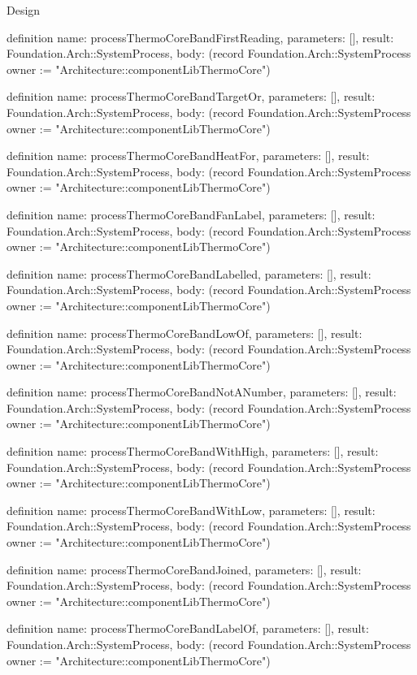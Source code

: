 \begin{lexlean}{Design}
\begin{semanticmodule}
definition{
  name: processThermoCoreBandFirstReading,
  parameters: [],
  result: Foundation.Arch::SystemProcess,
  body: (record Foundation.Arch::SystemProcess {owner := "Architecture::componentLibThermoCore"})
}

definition{
  name: processThermoCoreBandTargetOr,
  parameters: [],
  result: Foundation.Arch::SystemProcess,
  body: (record Foundation.Arch::SystemProcess {owner := "Architecture::componentLibThermoCore"})
}

definition{
  name: processThermoCoreBandHeatFor,
  parameters: [],
  result: Foundation.Arch::SystemProcess,
  body: (record Foundation.Arch::SystemProcess {owner := "Architecture::componentLibThermoCore"})
}

definition{
  name: processThermoCoreBandFanLabel,
  parameters: [],
  result: Foundation.Arch::SystemProcess,
  body: (record Foundation.Arch::SystemProcess {owner := "Architecture::componentLibThermoCore"})
}

definition{
  name: processThermoCoreBandLabelled,
  parameters: [],
  result: Foundation.Arch::SystemProcess,
  body: (record Foundation.Arch::SystemProcess {owner := "Architecture::componentLibThermoCore"})
}

definition{
  name: processThermoCoreBandLowOf,
  parameters: [],
  result: Foundation.Arch::SystemProcess,
  body: (record Foundation.Arch::SystemProcess {owner := "Architecture::componentLibThermoCore"})
}

definition{
  name: processThermoCoreBandNotANumber,
  parameters: [],
  result: Foundation.Arch::SystemProcess,
  body: (record Foundation.Arch::SystemProcess {owner := "Architecture::componentLibThermoCore"})
}

definition{
  name: processThermoCoreBandWithHigh,
  parameters: [],
  result: Foundation.Arch::SystemProcess,
  body: (record Foundation.Arch::SystemProcess {owner := "Architecture::componentLibThermoCore"})
}

definition{
  name: processThermoCoreBandWithLow,
  parameters: [],
  result: Foundation.Arch::SystemProcess,
  body: (record Foundation.Arch::SystemProcess {owner := "Architecture::componentLibThermoCore"})
}

definition{
  name: processThermoCoreBandJoined,
  parameters: [],
  result: Foundation.Arch::SystemProcess,
  body: (record Foundation.Arch::SystemProcess {owner := "Architecture::componentLibThermoCore"})
}

definition{
  name: processThermoCoreBandLabelOf,
  parameters: [],
  result: Foundation.Arch::SystemProcess,
  body: (record Foundation.Arch::SystemProcess {owner := "Architecture::componentLibThermoCore"})
}


\end{semanticmodule}
\end{lexlean}
